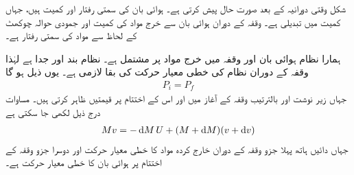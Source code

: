 شکل   وقتی دورانیہ  کے بعد صورت حال پیش کرتی ہے۔ ہوائی بان کی سمتی رفتار  اور کمیت  ہیں، جہاں کمیت میں تبدیلی  ہے۔ وقفہ  کے دوران ہوائی بان سے  خرج  مواد کی کمیت   اور جمودی  حوالہ چوکھٹ کے لحاظ  سے    مواد کی سمتی  رفتار  ہے۔

ہمارا  نظام  ہوائی بان اور وقفہ  میں  خرج  مواد پر مشتمل ہے۔ نظام بند اور  جدا ہے لہٰذا وقفہ  کے دوران نظام کی خطی معیار حرکت کی بقا لازمی ہے۔ یوں ذیل ہو گا
\begin{align}\label{مساوات_مرکز_کمیت_معیار_بقا_لازمی}
P_i=P_f
\end{align}
جہاں زیر نوشت   اور  بالترتیب  وقفہ   کے آغاز میں اور  اس کے اختتام پر قیمتیں ظاہر کرتی ہیں۔ مساوات  درج ذیل لکھی جا سکتی ہے
\begin{align}\label{مساوات_مرکز_کمیت_وقفہ_کے_دوران}
Mv=-\dif M \,U+(M+\dif M)(v+\dif v)
\end{align}
جہاں دائیں ہاتھ پہلا جزو وقفہ   کے دوران خارج کردہ مواد کا  خطی معیار حرکت اور  دوسرا جزو وقفہ   کے اختتام  پر ہوائی بان کا خطی معیار حرکت  ہے۔

